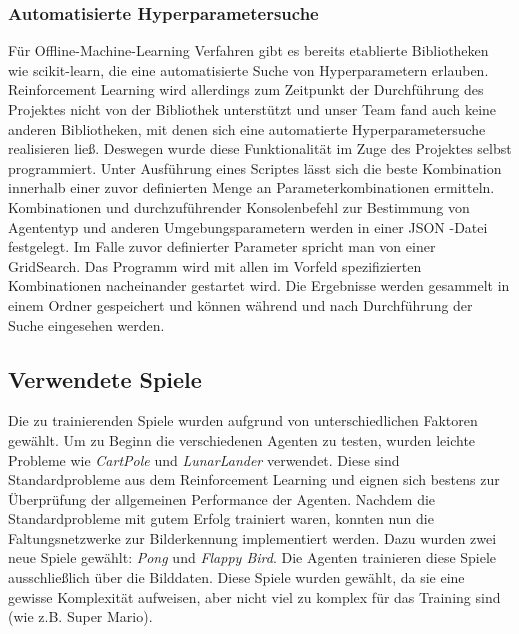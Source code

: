 \documentclass[12pt,a4paper]{article}
\begin{document}
\subsubsection{Automatisierte Hyperparametersuche}
Für Offline-Machine-Learning Verfahren gibt es bereits etablierte Bibliotheken wie scikit-learn, die eine automatisierte Suche von Hyperparametern erlauben.
Reinforcement Learning wird allerdings zum Zeitpunkt der Durchführung des Projektes nicht von der Bibliothek unterstützt und unser Team fand auch keine anderen Bibliotheken, mit denen sich eine automatierte Hyperparametersuche realisieren ließ.
\newline
Deswegen wurde diese Funktionalität im Zuge des Projektes selbst programmiert.
Unter Ausführung eines Scriptes lässt sich die beste Kombination innerhalb einer zuvor definierten Menge an Parameterkombinationen ermitteln.
Kombinationen und durchzuführender Konsolenbefehl zur Bestimmung von Agententyp und anderen Umgebungsparametern werden in einer JSON -Datei festgelegt.
Im Falle zuvor definierter Parameter spricht man von einer GridSearch. \cite{medium:gridsearch}
\newline
Das Programm wird mit allen im Vorfeld spezifizierten Kombinationen nacheinander gestartet wird.
Die Ergebnisse werden gesammelt in einem Ordner gespeichert und können während und nach Durchführung der Suche eingesehen werden.


\subsection{Verwendete Spiele}
Die zu trainierenden Spiele wurden aufgrund von unterschiedlichen Faktoren gewählt.
Um zu Beginn die verschiedenen Agenten zu testen, wurden leichte Probleme wie \textit{CartPole} und \textit{LunarLander} verwendet.
Diese sind Standardprobleme aus dem Reinforcement Learning und eignen sich bestens zur Überprüfung der allgemeinen Performance der Agenten.
Nachdem die Standardprobleme mit gutem Erfolg trainiert waren, konnten nun die Faltungsnetzwerke zur Bilderkennung implementiert werden.
Dazu wurden zwei neue Spiele gewählt: \textit{Pong} und \textit{Flappy Bird}.
Die Agenten trainieren diese Spiele ausschließlich über die Bilddaten.
Diese Spiele wurden gewählt, da sie eine gewisse Komplexität aufweisen, aber nicht viel zu komplex für das Training sind (wie z.B. Super Mario).
\end{document}
